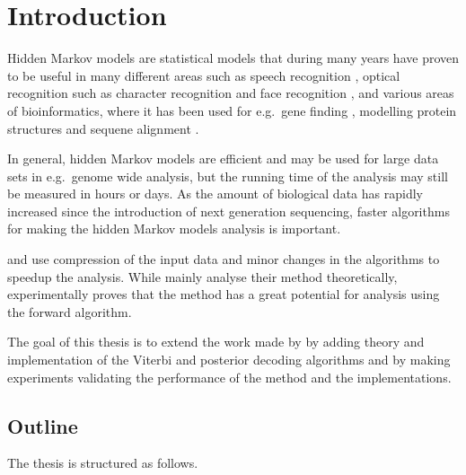 \chapter{Introduction}

Hidden Markov models are statistical models that during many years have proven
to be useful in many different areas such as speech recognition
\citep{rabiner1989tutorial}, optical recognition such as character recognition
\citep{agazzi1993hidden} and face recognition \citep{nefian1998hidden}, and
various areas of bioinformatics, where it has been used for e.g.\ gene finding
\citep{burge1997prediction}, modelling protein structures and sequene alignment
\citep{eddy1998profile}.

In general, hidden Markov models are efficient and may be used for large data
sets in e.g.\ genome wide analysis, but the running time of the analysis may
still be measured in hours or days. As the amount of biological data has
rapidly increased since the introduction of next generation sequencing, faster
algorithms for making the hidden Markov models analysis is important.

\citet{lifshits2009speeding} and \citet{sand2013ziphmmlib} use compression of
the input data and minor changes in the algorithms to speedup the
analysis. While \citet{lifshits2009speeding} mainly analyse their method
theoretically, \citet{sand2013ziphmmlib} experimentally proves that the method
has a great potential for analysis using the forward algorithm.

The goal of this thesis is to extend the work made by \citet{sand2013ziphmmlib}
by adding theory and implementation of the Viterbi and posterior decoding
algorithms and by making experiments validating the performance of the method
and the implementations.

\section{Outline}

The thesis is structured as follows.


